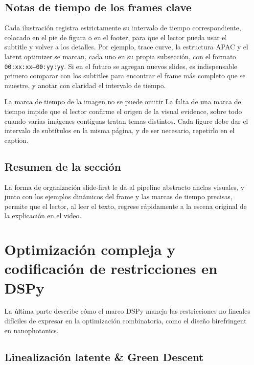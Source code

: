 \documentclass[a4paper]{article}
\begin{document}
\subsection{Notas de tiempo de los frames clave}
Cada ilustración registra estrictamente su intervalo de tiempo correspondiente, colocado en el pie de figura o en el footer, para que el lector pueda usar el subtitle y volver a los detalles. Por ejemplo, trace curve, la estructura APAC y el latent optimizer se marcan, cada uno en su propia subsección, con el formato \texttt{00:xx:xx--00:yy:yy}. Si en el futuro se agregan nuevos slides, es indispensable primero comparar con los subtitles para encontrar el frame más completo que se muestre, y anotar con claridad el intervalo de tiempo.
\begin{warningbox}{La marca de tiempo de la imagen no se puede omitir}
La falta de una marca de tiempo impide que el lector confirme el origen de la visual evidence, sobre todo cuando varias imágenes contiguas tratan temas distintos. Cada figure debe dar el intervalo de subtítulos en la misma página, y de ser necesario, repetirlo en el caption.
\end{warningbox}

\subsection{Resumen de la sección}
La forma de organización slide-first le da al pipeline abstracto anclas visuales, y junto con los ejemplos dinámicos del frame y las marcas de tiempo precisas, permite que el lector, al leer el texto, regrese rápidamente a la escena original de la explicación en el video.

\section{Optimización compleja y codificación de restricciones en DSPy}

La última parte describe cómo el marco DSPy maneja las restricciones no lineales difíciles de expresar en la optimización combinatoria, como el diseño birefringent en nanophotonics.

\subsection{Linealización latente \& Green Descent}
\end{document}
